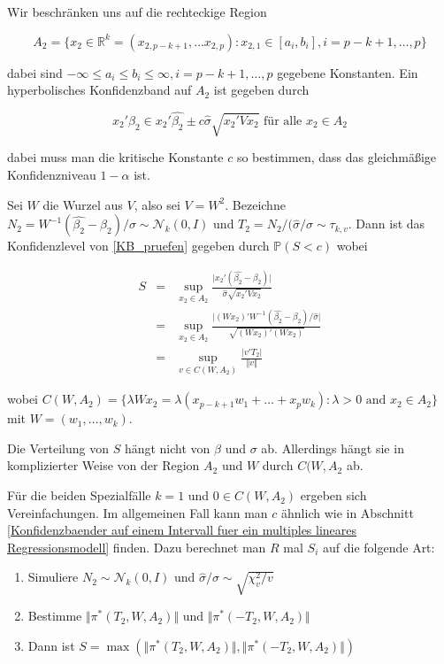 \documentclass[12pt,a4paper]{article}
\theoremstyle{definition}
\theoremstyle{definition}
\theoremstyle{definition}
\theoremstyle{definition}
\begin{document}
Wir beschränken uns auf die rechteckige Region

\begin{equation*}
A_2 = \{ x_2 \in \mathbb{R}^k =(x_{2,p-k+1}, \ldots x_{2,p}) : x_{2,1} \in [a_i,b_i], i=p-k+1, \ldots, p \}
\end{equation*}

dabei sind $- \infty \leq a_i \leq b_i \leq \infty, i = p-k+1, \ldots, p$ gegebene Konstanten. Ein hyperbolisches Konfidenzband auf $A_2$ ist gegeben durch

\begin{equation}\label{KB_pruefen}
x_2'\beta_2 \in x_2'\hat{\beta_2} \pm c \hat{\sigma}\sqrt{x_2'Vx_2} \text{ für alle } x_2 \in A_2
\end{equation}

dabei muss man die kritische Konstante $c$ so bestimmen, dass das gleichmäßige Konfidenzniveau $1 - \alpha$ ist.

Sei $W$ die Wurzel aus $V$, also sei $V=W^2$. Bezeichne $N_2=W^{-1}(\hat{\beta_2}-\beta_2)/\sigma \sim \mathscr{N}_{k}(0,I)$ und $T_2 = N_2/(\hat{\sigma}/\sigma \sim \tau_{k,v}$. Dann ist das Konfidenzlevel von \eqref{KB_pruefen} gegeben durch $\mathbb{P}(S<c)$ wobei

\begin{eqnarray*}
S &=& \sup_{x_2 \in A_2} \frac{\vert x_2' (\hat{\beta_2} - \beta_2) \vert }{\hat{\sigma} \sqrt{x_2' V  x_2}} \\
&=& \sup_{x_2 \in A_2} \frac{\vert (Wx_2)'W^{-1} (\hat{\beta_2}-\beta_2)/\hat{\sigma} \vert}{\sqrt{(Wx_2)'(Wx_2)}} \\
&=& \sup_{v \in C(W,A_2)} \frac{\vert v'T_2 \vert }{\Vert v \Vert}
\end{eqnarray*}

wobei $C(W,A_2)=\{ \lambda W x_2 = \lambda(x_{p-k+1} w_1 + \ldots + x_p w_k) : \lambda > 0 \text{ and } x_2 \in A_2 \}$ mit $W=(w_1, \ldots, w_k)$. 

Die Verteilung von $S$ hängt nicht von $\beta$ und $\sigma$ ab. Allerdings hängt sie in komplizierter Weise von der Region $A_2$ und $W$ durch $C(W,A_2$ ab.

Für die beiden Spezialfälle $k=1$ und $0 \in C(W,A_2)$ ergeben sich Vereinfachungen. Im allgemeinen Fall kann man $c$ ähnlich wie in Abschnitt \ref{Konfidenzbaender auf einem Intervall fuer ein multiples lineares Regressionsmodell} finden. Dazu berechnet man $R$ mal $S_i$ auf die folgende Art:

\begin{enumerate}
\item Simuliere $N_2 \sim \mathscr{N}_{k}(0,I)$ und $\hat{\sigma}/\sigma \sim \sqrt{\chi^2_v/v}$
\item Bestimme $\Vert \pi^{*}(T_2,W,A_2) \Vert$ und $\Vert \pi^{*}(-T_2,W,A_2) \Vert$
\item Dann ist $S= \max(\Vert \pi^{*}(T_2,W,A_2) \Vert, \Vert \pi^{*}(-T_2,W,A_2) \Vert )$
\end{enumerate}
\end{document}
